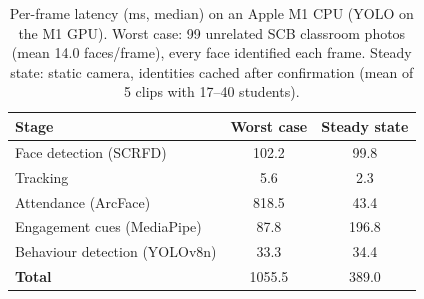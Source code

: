 \begin{table}[H]
\caption{Per-frame latency (ms, median) on an Apple M1 CPU (YOLO on the M1 GPU). Worst case: 99 unrelated SCB classroom photos (mean 14.0 faces/frame), every face identified each frame. Steady state: static camera, identities cached after confirmation (mean of 5 clips with 17--40 students).}
\centering
\label{tab:latency}
\begin{tabular}{lcc}
\toprule
\bf Stage & \bf Worst case & \bf Steady state \\
\midrule
Face detection (SCRFD) & 102.2 & 99.8 \\
Tracking & 5.6 & 2.3 \\
Attendance (ArcFace) & 818.5 & 43.4 \\
Engagement cues (MediaPipe) & 87.8 & 196.8 \\
Behaviour detection (YOLOv8n) & 33.3 & 34.4 \\
\bf Total & 1055.5 & 389.0 \\
\bottomrule
\end{tabular}
\end{table}
